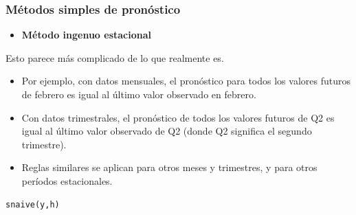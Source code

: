 \documentclass[10pt]{beamer}
\begin{document}


\begin{frame}[fragile]
\frametitle{Métodos simples de pronóstico}


\begin{itemize}
\item \textbf{Método ingenuo estacional}
\end{itemize}

Esto parece más complicado de lo que realmente es. 

\vspace{4mm}

\begin{itemize}
\item Por ejemplo, con datos mensuales, el pronóstico para todos los valores futuros de febrero es igual al último valor observado en febrero. 
\item Con datos trimestrales, el pronóstico de todos los valores futuros de Q2 es igual al último valor observado de Q2 (donde Q2 significa el segundo trimestre). 
\item Reglas similares se aplican para otros meses y trimestres, y para otros períodos estacionales.
\end{itemize}


\lstset{language=r,label= ,caption= ,captionpos=b,numbers=none}
\begin{lstlisting}
snaive(y,h)
\end{lstlisting}



\end{frame}


\end{document}

